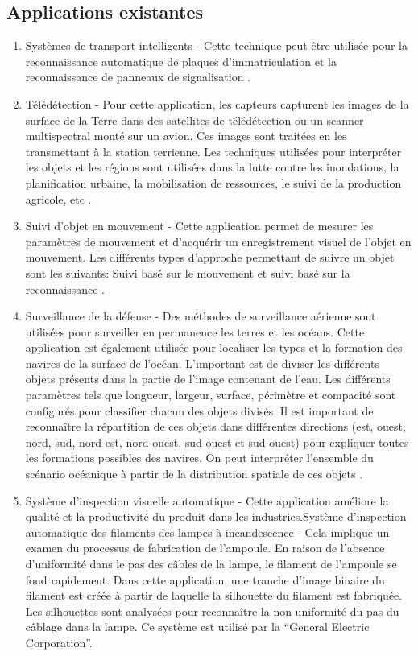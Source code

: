 \documentclass[12pt]{article}
\begin{document}
\subsection{Applications existantes}
\begin{enumerate}
	\item Systèmes de transport intelligents - Cette technique peut être utilisée pour la reconnaissance automatique de plaques d'immatriculation et la reconnaissance de panneaux de signalisation \cite{15}.
	\item Télédétection - Pour cette application, les capteurs capturent les images de la surface de la Terre dans des satellites de télédétection ou un scanner multispectral monté sur un avion. Ces images sont traitées en les transmettant à la station terrienne. Les techniques utilisées pour interpréter les objets et les régions sont utilisées dans la lutte contre les inondations, la planification urbaine, la mobilisation de ressources, le suivi de la production agricole, etc \cite{16}.
	\item Suivi d'objet en mouvement - Cette application permet de mesurer les paramètres de mouvement et d'acquérir un enregistrement visuel de l'objet en mouvement. Les différents types d’approche permettant de suivre un objet sont les suivants: Suivi basé sur le mouvement et suivi basé sur la reconnaissance \cite{17}.
	\item Surveillance de la défense - Des méthodes de surveillance aérienne sont utilisées pour surveiller en permanence les terres et les océans. Cette application est également utilisée pour localiser les types et la formation des navires de la surface de l'océan. L'important est de diviser les différents objets présents dans la partie de l'image contenant de l'eau. Les différents paramètres tels que longueur, largeur, surface, périmètre et compacité sont configurés pour classifier chacun des objets divisés. Il est important de reconnaître la répartition de ces objets dans différentes directions (est, ouest, nord, sud, nord-est, nord-ouest, sud-ouest et sud-ouest) pour expliquer toutes les formations possibles des navires. On peut interpréter l'ensemble du scénario océanique à partir de la distribution spatiale de ces objets \cite{18}.
	\item Système d'inspection visuelle automatique - Cette application améliore la qualité et la productivité du produit dans les industries.Système d’inspection automatique des filaments des lampes à incandescence - Cela implique un examen du processus de fabrication de l'ampoule. En raison de l’absence d’uniformité dans le pas des câbles de la lampe, le filament de l’ampoule se fond rapidement. Dans cette application, une tranche d'image binaire du filament est créée à partir de laquelle la silhouette du filament est fabriquée. Les silhouettes sont analysées pour reconnaître la non-uniformité du pas du câblage dans la lampe. Ce système est utilisé par la “General Electric Corporation”.

\end{enumerate}
\end{document}
